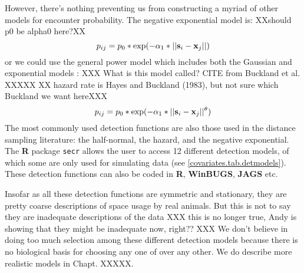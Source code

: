 However, there's nothing preventing us from constructing a myriad of
other models for encounter probability.
The negative exponential model is: XXshould p0 be alpha0 here?XX
\[
p_{ij} = p_{0}*\exp(-\alpha_{1} *||{\bf s}_{i}-{\bf x}_{j}||)
\]
or we could use the general power model which includes both the
Gaussian and exponential models \citep{russell_etal:2012}: XXX What is
this model called? CITE from Buckland et al. XXXXX
XX hazard rate is Hayes and Buckland (1983), but not sure which Buckland we want hereXXX
\[
p_{ij} = p_{0}*\exp(-\alpha_{1} *||{\bf s}_{i}-{\bf x}_{j}||^{\theta} )
\]
The most commonly used detection
functions are also those used in the distance sampling literature: the
half-normal, the hazard, and the negative exponential.
The {\bf R} package
{\tt secr} allows the user to access 12 different detection models, of which
some are only used for simulating data (see \ref{covariates.tab.detmodels}). These detection
functions can  also be coded in {\bf R}, {\bf WinBUGS},
{\bf JAGS} etc.

Insofar as all these detection functions are symmetric and stationary, they are pretty
coarse descriptions of space usage by real animals. But this is not to
say they are inadequate descriptions of the data XXX this is no longer true, Andy
is showing that they might be inadequate now, right?? XXX
We don't believe in doing too much
selection among these different detection models because there is no biological basis for
choosing any one of over any other. We do describe more
realistic models in Chapt. XXXXX.


